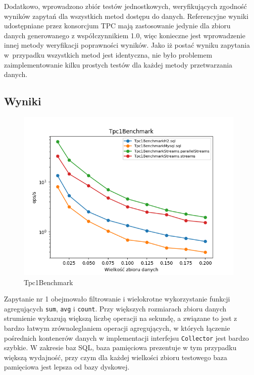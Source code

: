 \documentclass[12pt,twoside,openright]{extarticle}
\begin{document}
    Dodatkowo, wprowadzono zbiór testów jednostkowych, weryfikujących zgodność wyników zapytań dla wszystkich metod dostępu do danych. Referencyjne wyniki \cite{tpcresults} udostępniane przez konsorcjum TPC mają zastosowanie jedynie dla zbioru danych generowanego z współczynnikiem 1.0, więc konieczne jest wprowadzenie innej metody weryfikacji poprawności wyników. Jako iż postać wyniku zapytania w~przypadku wszystkich metod jest identyczna, nie było problemem zaimplementowanie kilku prostych testów dla każdej metody przetwarzania danych.


\newpage
\subsection{Wyniki} \label{tpcgraphs}

\begin{figure}[h]
\centering
\includegraphics[width=15cm]{plots/Tpc1Benchmark}
\caption{Tpc1Benchmark}
\end{figure}

    Zapytanie nr 1 obejmowało filtrowanie i wielokrotne wykorzystanie funkcji agregujących \texttt{sum}, \texttt{avg} i \texttt{count}. Przy większych rozmiarach zbioru danych strumienie wykazują większą liczbę operacji na sekundę, a związane to jest z bardzo łatwym zrównoleglaniem operacji agregujących, w których łączenie pośrednich kontenerów danych w implementacji interfejsu \texttt{Collector} jest bardzo szybkie. W zakresie baz SQL, baza pamięciowa prezentuje w tym przypadku większą wydajność, przy czym dla każdej wielkości zbioru testowego baza pamięciowa jest lepsza od bazy dyskowej. 
\end{document}
